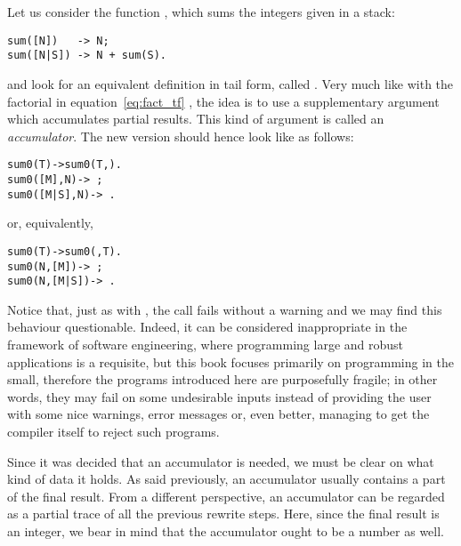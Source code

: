 Let us consider the function , which sums the integers
given in a stack:
\begin{verbatim}
sum([N])   -> N;
sum([N|S]) -> N + sum(S).
\end{verbatim}
and look for an equivalent definition in tail form, called
. Very much like with the factorial in
equation~\eqref{eq:fact_tf} , the idea is to use
a supplementary argument which accumulates partial results. This kind
of argument is called an \emph{accumulator}. The new version should
hence look like as follows:
\begin{alltt}
sum0(T)       -> sum0(T,).
sum0([M],N)   -> \,;
sum0([M|S],N) -> \,.
\end{alltt}
or, equivalently,
\begin{alltt}
sum0(T)       -> sum0(,T).
sum0(N,[M])   -> \,;
sum0(N,[M|S]) -> \,.
\end{alltt}
Notice that, just as with , the call 
fails without a warning and we may find this behaviour
questionable. Indeed, it can be considered inappropriate in the
framework of software engineering, where programming large and robust
applications is a requisite, but this book focuses primarily on
programming in the small, therefore the programs introduced here are
purposefully fragile; in other words, they may fail on some
undesirable inputs instead of providing the user with some nice
warnings, error messages or, even better, managing to get the compiler
itself to reject such programs.

Since it was decided that an accumulator is needed, we must be clear
on what kind of data it holds. As said previously, an accumulator
usually contains a part of the final result. From a different
perspective, an accumulator can be regarded as a partial trace of all
the previous rewrite steps. Here, since the final result is an
integer, we bear in mind that the accumulator ought to be a number as
well.

